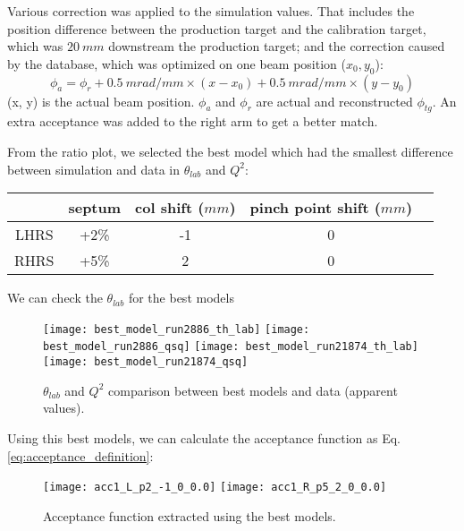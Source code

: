 Various correction was applied to the simulation values. That includes the position
difference between the production target and the calibration target, which was
$20\ mm$ downstream the production \Ca target; and the correction caused by
the database, which was optimized on one beam position ($x_0, y_0$):
\begin{equation}
    \phi_a = \phi_r + 0.5\ mrad/mm \times (x - x_0) + 0.5\ mrad/mm \times (y - y_0)
\end{equation}
(x, y) is the actual beam position. $\phi_a$ and $\phi_r$ are actual and reconstructed
$\phi_{tg}$. An extra acceptance was added to the right arm to get a better 
match.

From the ratio plot, we selected the best model which had the smallest difference
between simulation and data in $\theta_{lab}$ and $Q^2$:
\begin{table}[h!]
    \centering
    \begin{tabular}{c | c c c c}
	\hline
	    & septum & col shift ($mm$)	& pinch point shift ($mm$)	\\
	\hline
	LHRS	& +2\%	& -1	& 0 \\
	RHRS	& +5\%	& 2	& 0 \\
	\hline
    \end{tabular}
\end{table}

We can check the $\theta_{lab}$ for the best models
\begin{figure}[H]
    \centering
    \texttt{[image: best\_model\_run2886\_th\_lab]}
    \texttt{[image: best\_model\_run2886\_qsq]}
    \texttt{[image: best\_model\_run21874\_th\_lab]}
    \texttt{[image: best\_model\_run21874\_qsq]}
    \caption{$\theta_{lab}$ and $Q^2$ comparison between best models and data (apparent values).}
\end{figure}

Using this best models, we can calculate the acceptance function as Eq. \ref{eq:acceptance_definition}:
\begin{figure}[H]
    \centering
    \texttt{[image: acc1\_L\_p2\_-1\_0\_0.0]}
    \texttt{[image: acc1\_R\_p5\_2\_0\_0.0]}
    \caption{Acceptance function extracted using the best models.}
\end{figure}

